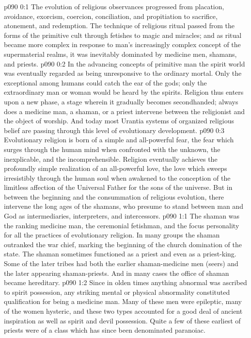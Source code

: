 \author{Melchizedek}
\vs p090 0:1 The evolution of religious observances progressed from placation, avoidance, exorcism, coercion, conciliation, and propitiation to sacrifice, atonement, and redemption. The technique of religious ritual passed from the forms of the primitive cult through fetishes to magic and miracles; and as ritual became more complex in response to man’s increasingly complex concept of the supermaterial realms, it was inevitably dominated by medicine men, shamans, and priests.\plusone
\vs p090 0:2 In the advancing concepts of primitive man the spirit world was eventually regarded as being unresponsive to the ordinary mortal. Only the exceptional among humans could catch the ear of the gods; only the extraordinary man or woman would be heard by the spirits. Religion thus enters upon a new phase, a stage wherein it gradually becomes secondhanded; always does a medicine man, a shaman, or a priest intervene between the religionist and the object of worship. And today most Urantia systems of organized religious belief are passing through this level of evolutionary development.
\vs p090 0:3 Evolutionary religion is born of a simple and all\hyp{}powerful fear, the fear which surges through the human mind when confronted with the unknown, the inexplicable, and the incomprehensible. Religion eventually achieves the profoundly simple realization of an all\hyp{}powerful love, the love which sweeps irresistibly through the human soul when awakened to the conception of the limitless affection of the Universal Father for the sons of the universe. But in between the beginning and the consummation of religious evolution, there intervene the long ages of the shamans, who presume to stand between man and God as intermediaries, interpreters, and intercessors.
\vs p090 1:1 The shaman was the ranking medicine man, the ceremonial fetishman, and the focus personality for all the practices of evolutionary religion. In many groups the shaman outranked the war chief, marking the beginning of the church domination of the state. The shaman sometimes functioned as a priest and even as a priest\hyp{}king. Some of the later tribes had both the earlier shaman\hyp{}medicine men (seers) and the later appearing shaman\hyp{}priests. And in many cases the office of shaman became hereditary.
\vs p090 1:2 Since in olden times anything abnormal was ascribed to spirit possession, any striking mental or physical abnormality constituted qualification for being a medicine man. Many of these men were epileptic, many of the women hysteric, and these two types accounted for a good deal of ancient inspiration as well as spirit and devil possession. Quite a few of these earliest of priests were of a class which has since been denominated paranoiac.
